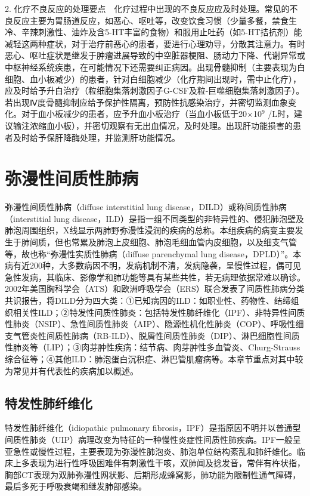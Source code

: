 2.
化疗不良反应的处理要点　化疗过程中出现的不良反应应及时处理。常见的不良反应主要为胃肠道反应，如恶心、呕吐等，改变饮食习惯（少量多餐，禁食生冷、辛辣刺激性、油炸及含5-HT丰富的食物）和服用止吐药（如5-HT拮抗剂）能减轻这两种症状，对于治疗前恶心的患者，要进行心理劝导，分散其注意力。有时恶心、呕吐症状是继发于肿瘤进展导致的中空脏器梗阻、肠动力下降、代谢异常或中枢神经系统疾患，在可能情况下还需要纠正病因。出现骨髓抑制（主要表现为白细胞、血小板减少）的患者，针对白细胞减少（化疗期间出现时，需中止化疗），应及时给予升白治疗（粒细胞集落刺激因子G-CSF及粒-巨噬细胞集落刺激因子）。若出现Ⅳ度骨髓抑制应给予保护性隔离，预防性抗感染治疗，并密切监测血象变化。对于血小板减少的患者，应予升血小板治疗（当血小板低于20×10$^{9}$
/L时，建议输注浓缩血小板），并密切观察有无出血情况，及时处理。出现肝功能损害的患者及时给予保肝降酶处理，并监测肝功能情况。

\section{弥漫性间质性肺病}

弥漫性间质性肺病（diffuse interstitial lung
disease，DILD）或称间质性肺病（interstitial lung
disease，ILD）是指一组不同类型的非特异性的、侵犯肺泡壁及肺泡周围组织，X线显示两肺野弥漫性浸润的疾病的总称。本组疾病的病变主要发生于肺间质，但也常累及肺泡上皮细胞、肺泡毛细血管内皮细胞，以及细支气管等，故也称“弥漫性实质性肺病（diffuse
parenchymal lung
disease，DPLD）”。本病有近200种，大多数病因不明，发病机制不清，发病隐袭，呈慢性过程，偶可见急性发病，其临床、影像学和肺功能等具有某些共性，若无病理依据常难以确诊。2002年美国胸科学会（ATS）和欧洲呼吸学会（ERS）联合发表了间质性肺病分类共识报告，将DILD分为四大类：①已知病因的ILD：如职业性、药物性、结缔组织相关性ILD；②特发性间质性肺炎：包括特发性肺纤维化（IPF）、非特异性间质性肺炎（NSIP）、急性间质性肺炎（AIP）、隐源性机化性肺炎（COP）、呼吸性细支气管炎性间质性肺病（RB-ILD）、脱屑性间质性肺炎（DIP）、淋巴细胞性间质性肺炎等（LIP）；③肉芽肿性疾病：结节病、肉芽肿性多血管炎、Churg-Strauss综合征等；④其他ILD：肺泡蛋白沉积症、淋巴管肌瘤病等。本章节重点对其中较为常见并有代表性的疾病加以概述。

\subsection{特发性肺纤维化}

特发性肺纤维化（idiopathic pulmonary
fibrosis，IPF）是指原因不明并以普通型间质性肺炎（UIP）病理改变为特征的一种慢性炎症性间质性肺疾病。IPF一般呈亚急性或慢性过程，主要表现为弥漫性肺泡炎、肺泡单位结构紊乱和肺纤维化。临床上多表现为进行性呼吸困难伴有刺激性干咳，双肺闻及捻发音，常伴有杵状指，胸部CT表现为双肺弥漫性网状影、后期形成蜂窝影，肺功能为限制性通气障碍，最后多死于呼吸衰竭和继发肺部感染。

